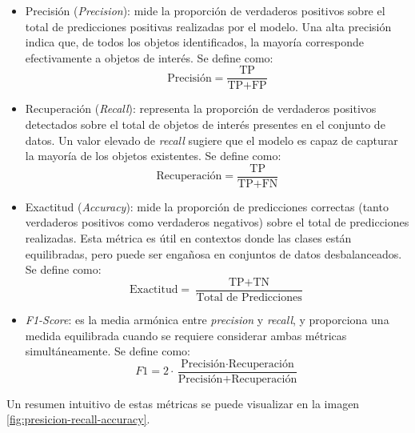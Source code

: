\begin{itemize}
	\item Precisión (\textit{Precision}): mide la proporción de verdaderos positivos sobre el total de predicciones positivas realizadas por el modelo. Una alta precisión indica que, de todos los objetos identificados, la mayoría corresponde efectivamente a objetos de interés. Se define como:
	      \begin{equation}
		      \text{Precisión} = \frac{\text{TP}}{\text{TP} + \text{FP}}
		      \label{eq:precision}
	      \end{equation}
	\item Recuperación (\textit{Recall}): representa la proporción de verdaderos positivos detectados sobre el total de objetos de interés presentes en el conjunto de datos. Un valor elevado de \textit{recall} sugiere que el modelo es capaz de capturar la mayoría de los objetos existentes. Se define como:
	      \begin{equation}
		      \text{Recuperación} = \frac{\text{TP}}{\text{TP} + \text{FN}}
		      \label{eq:recuperacion}
	      \end{equation}
	\item Exactitud (\textit{Accuracy}): mide la proporción de predicciones correctas (tanto verdaderos positivos como verdaderos negativos) sobre el total de predicciones realizadas. Esta métrica es útil en contextos donde las clases están equilibradas, pero puede ser engañosa en conjuntos de datos desbalanceados. Se define como:
	      \begin{equation}
		      \text{Exactitud} = \frac{\text{TP} + \text{TN}}{\text{Total de Predicciones}}
		      \label{eq:exactitud}
	      \end{equation}
	\item \textit{F1-Score}: es la media armónica entre \textit{precision} y \textit{recall}, y proporciona una medida equilibrada cuando se requiere considerar ambas métricas simultáneamente. Se define como:
	      \begin{equation}
		      F1 = 2 \cdot \frac{\text{Precisión} \cdot \text{Recuperación}}{\text{Precisión} + \text{Recuperación}}
		      \label{eq:f1}
	      \end{equation}
\end{itemize}

Un resumen intuitivo de estas métricas se puede visualizar en la imagen \ref{fig:presicion-recall-accuracy}.


